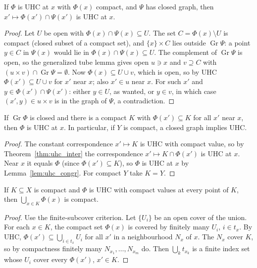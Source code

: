 \begin{theorem}
\label{thm:uhc_inter}
\leanok
{}
If $\Phi$ is UHC at $x$ with $\Phi(x)$ compact, and $\Psi$ has closed graph, then
$x' \mapsto \Phi(x') \cap \Psi(x')$ is UHC at $x$.
\end{theorem}
\begin{proof}
\leanok
Let $U$ be open with $\Phi(x) \cap \Psi(x) \subseteq U$. The set $C = \Phi(x) \setminus U$ is compact
(closed subset of a compact set), and $\{x\} \times C$ lies outside $\operatorname{Gr}\Psi$: a point
$y \in C$ in $\Psi(x)$ would lie in $\Phi(x) \cap \Psi(x) \subseteq U$. The complement of
$\operatorname{Gr}\Psi$ is open, so the generalized tube lemma gives open $u \ni x$ and
$v \supseteq C$ with $(u \times v) \cap \operatorname{Gr}\Psi = \emptyset$. Now
$\Phi(x) \subseteq U \cup v$, which is open, so by UHC $\Phi(x') \subseteq U \cup v$ for $x'$ near $x$;
also $x' \in u$ near $x$. For such $x'$ and $y \in \Phi(x') \cap \Psi(x')$: either $y \in U$, as
wanted, or $y \in v$, in which case $(x', y) \in u \times v$ is in the graph of $\Psi$, a contradiction.
\end{proof}

\begin{theorem}
\label{thm:uhc_of_closed_graph}
\leanok
{}
If $\operatorname{Gr}\Phi$ is closed and there is a compact $K$ with $\Phi(x') \subseteq K$ for all
$x'$ near $x$, then $\Phi$ is UHC at $x$. In particular, if $Y$ is compact, a closed graph implies UHC.
\end{theorem}
\begin{proof}
\leanok
The constant correspondence $x' \mapsto K$ is UHC with compact value, so by
Theorem~\ref{thm:uhc_inter} the correspondence $x' \mapsto K \cap \Phi(x')$ is UHC at $x$. Near $x$
it equals $\Phi$ (since $\Phi(x') \subseteq K$), so $\Phi$ is UHC at $x$ by Lemma~\ref{lem:uhc_congr}.
For compact $Y$ take $K = Y$.
\end{proof}

\begin{theorem}
\label{thm:compact_image}
\leanok
{}
If $K \subseteq X$ is compact and $\Phi$ is UHC with compact values at every point of $K$, then
$\bigcup_{x \in K}\Phi(x)$ is compact.
\end{theorem}
\begin{proof}
\leanok
Use the finite-subcover criterion. Let $\{U_i\}$ be an open cover of the union. For each $x \in K$, the
compact set $\Phi(x)$ is covered by finitely many $U_i$, $i \in t_x$. By UHC, $\Phi(x') \subseteq
\bigcup_{i \in t_x} U_i$ for all $x'$ in a neighbourhood $N_x$ of $x$. The $N_x$ cover $K$, so by
compactness finitely many $N_{x_1}, \ldots, N_{x_m}$ do. Then $\bigcup_k t_{x_k}$ is a finite index set
whose $U_i$ cover every $\Phi(x')$, $x' \in K$.
\end{proof}

